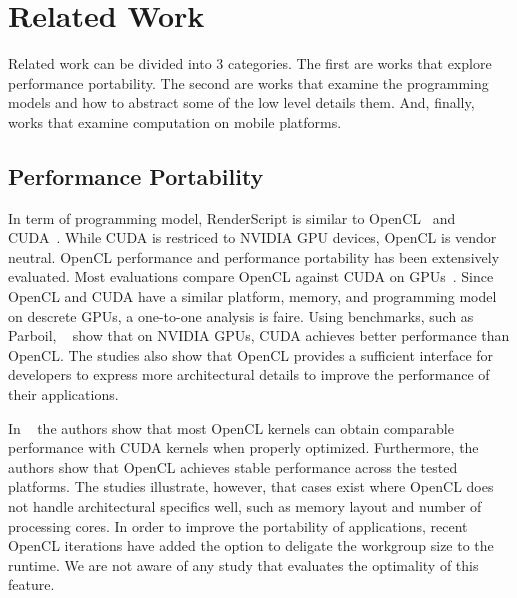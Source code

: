 \section{Related Work}
\label{sec:related}

Related work can be divided into $3$ categories.
The first are works that explore performance portability.
The second are works that examine the programming models and how to abstract some of the low level details them.
And, finally, works that examine computation on mobile platforms.

\subsection{Performance Portability}

In term of programming model, RenderScript is similar to OpenCL~\cite{OpenCL}
and CUDA~\cite{CUDA}. While CUDA is restriced to NVIDIA GPU devices, OpenCL is vendor neutral. OpenCL performance and performance portability
has been extensively evaluated.  Most evaluations compare OpenCL against CUDA on GPUs~\cite{fang2011comprehensive,
weber2011comparing, van2011correlating, vassilev2010comparison,
amorim2009comparing, karimi2010performance, komatsu2010evaluating}.  Since OpenCL and CUDA have a similar platform, memory, and programming model on descrete GPUs, a 
one-to-one analysis is faire.  Using benchmarks, such as Parboil, ~\cite{weber2011comparing,
van2011correlating, vassilev2010comparison, amorim2009comparing} show that on NVIDIA GPUs, CUDA achieves better performance than OpenCL. 
The studies also show that OpenCL
provides a sufficient interface for developers to express more architectural
details to improve the performance of their applications. 

In ~\cite{komatsu2010evaluating,fang2011comprehensive,dolbeau2013one} the authors show that
most OpenCL kernels can obtain comparable performance with CUDA kernels when
properly optimized.
Furthermore, the authors show that OpenCL
achieves stable performance across the tested platforms. The studies illustrate, however, that cases exist where OpenCL does not handle
architectural specifics well, such as memory layout and number of processing
cores. In order to improve the portability of applications, recent OpenCL
iterations have added the option to deligate the workgroup size to the runtime.
We are not aware of any study that evaluates the optimality of this feature.


